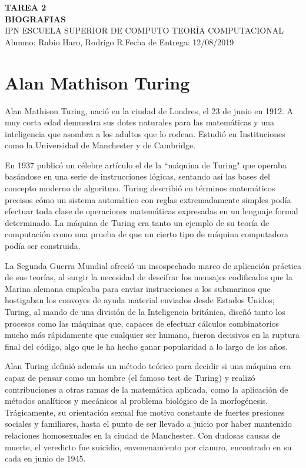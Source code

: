 \documentclass[letterpaper, 11pt]{article}
\begin{document}
\noindent
\large\textbf{TAREA 2} \\
\textbf{BIOGRAFIAS} \\
\normalsize IPN \textbar ESCUELA SUPERIOR DE COMPUTO \textbar TEORÍA COMPUTACIONAL \\
Alumno: Rubio Haro, Rodrigo R.\hfill Fecha de Entrega: 12/08/2019 \\
 

\section*{Alan Mathison Turing}
Alan Mathison Turing, nació en la ciudad de Londres, el 23 de junio en 1912. A muy corta edad demuestra sus dotes naturales para las matemáticas y una inteligencia que asombra a los adultos que lo rodean. Estudió en Instituciones como la Universidad de Manchester y de Cambridge.

\noindent En 1937 publicó un célebre artículo el de la ``máquina de Turing" que operaba basándose en una serie de instrucciones lógicas, sentando así las bases del concepto moderno de algoritmo. Turing describió en términos matemáticos precisos cómo un sistema automático con reglas extremadamente simples podía efectuar toda clase de operaciones matemáticas expresadas en un lenguaje formal determinado. La máquina de Turing era tanto un ejemplo de su teoría de computación como una prueba de que un cierto tipo de máquina computadora podía ser construida.

\noindent La Segunda Guerra Mundial ofreció un insospechado marco de aplicación práctica de sus teorías, al surgir la necesidad de descifrar los mensajes codificados que la Marina alemana empleaba para enviar instrucciones a los submarinos que hostigaban los convoyes de ayuda material enviados desde Estados Unidos; Turing, al mando de una división de la Inteligencia británica, diseñó tanto los procesos como las máquinas que, capaces de efectuar cálculos combinatorios mucho más rápidamente que cualquier ser humano, fueron decisivos en la ruptura final del código, algo que le ha hecho ganar popularidad a lo largo de los años.

\noindent Alan Turing definió además un método teórico para decidir si una máquina era capaz de pensar como un hombre (el famoso test de Turing) y realizó contribuciones a otras ramas de la matemática aplicada, como la aplicación de métodos analíticos y mecánicos al problema biológico de la morfogénesis. Trágicamente, su orientación sexual fue motivo constante de fuertes presiones sociales y familiares, hasta el punto de ser llevado a juicio por haber mantenido relaciones homosexuales en la ciudad de Manchester. Con dudosas causas de muerte, el veredicto fue suicidio, envenenamiento por cianuro, encontrado en su cada en junio de 1945.
\end{document}
